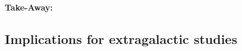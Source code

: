\documentclass[fleqn,usenatbib]{mnras}
\newcommand{\SB}[1]{{\textcolor{purple}{SB: #1}}}
\begin{document}
\paragraph*{Take-Away:} 


\subsection{Implications for extragalactic studies}




\end{document}
